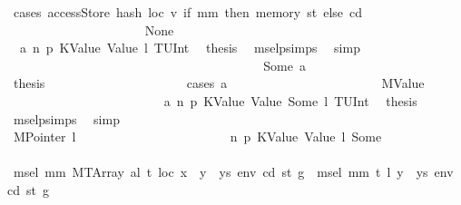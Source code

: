 \begin{isabellebody}
\ {\isacharparenleft}{\kern0pt}cases\ {\isachardoublequoteopen}accessStore\ {\isacharparenleft}{\kern0pt}hash\ loc\ v{\isacharparenright}{\kern0pt}\ {\isacharparenleft}{\kern0pt}if\ mm\ then\ memory\ st\ else\ cd{\isacharparenright}{\kern0pt}{\isachardoublequoteclose}{\isacharparenright}{\kern0pt}\isanewline
\ \ \ \ \ \ \ \ \ \ \ \ \ \ \ \ \ \ \ \ \isamarkupfalse%
\ None\isanewline
\ \ \ \ \ \ \ \ \ \ \ \ \ \ \ \ \ \ \ \ \isamarkupfalse%
\ {}\ a{}\ n\ p{}\ KValue\ Value\ l\ TUInt\ \isamarkupfalse%
\ {\isacharquery}{\kern0pt}thesis\ \isamarkupfalse%
\ msel{\isachardot}{\kern0pt}psimps{\isacharparenleft}{\kern0pt}{}{\isacharparenright}{\kern0pt}\ \isamarkupfalse%
\ simp\isanewline
\ \ \ \ \ \ \ \ \ \ \ \ \ \ \ \ \ \ \isamarkupfalse%
\isanewline
\ \ \ \ \ \ \ \ \ \ \ \ \ \ \ \ \ \ \ \ \isamarkupfalse%
\ {\isacharparenleft}{\kern0pt}Some\ a{\isacharparenright}{\kern0pt}\isanewline
\ \ \ \ \ \ \ \ \ \ \ \ \ \ \ \ \ \ \ \ \isamarkupfalse%
\ \isamarkupfalse%
\ {\isacharquery}{\kern0pt}thesis\isanewline
\ \ \ \ \ \ \ \ \ \ \ \ \ \ \ \ \ \ \ \ \isamarkupfalse%
\ {\isacharparenleft}{\kern0pt}cases\ a{\isacharparenright}{\kern0pt}\isanewline
\ \ \ \ \ \ \ \ \ \ \ \ \ \ \ \ \ \ \ \ \ \ \isamarkupfalse%
\ {\isacharparenleft}{\kern0pt}MValue\ {\isacharunderscore}{\kern0pt}{\isacharparenright}{\kern0pt}\isanewline
\ \ \ \ \ \ \ \ \ \ \ \ \ \ \ \ \ \ \ \ \ \ \isamarkupfalse%
\ {}\ a{}\ n\ p{}\ KValue\ Value\ Some\ l\ TUInt\ \isamarkupfalse%
\ {\isacharquery}{\kern0pt}thesis\ \isamarkupfalse%
\ msel{\isachardot}{\kern0pt}psimps{\isacharparenleft}{\kern0pt}{}{\isacharparenright}{\kern0pt}\ \isamarkupfalse%
\ simp\isanewline
\ \ \ \ \ \ \ \ \ \ \ \ \ \ \ \ \ \ \ \ \isamarkupfalse%
\isanewline
\ \ \ \ \ \ \ \ \ \ \ \ \ \ \ \ \ \ \ \ \ \ \isamarkupfalse%
\ {\isacharparenleft}{\kern0pt}MPointer\ l{\isacharparenright}{\kern0pt}\isanewline
\ \ \ \ \ \ \ \ \ \ \ \ \ \ \ \ \ \ \ \ \ \ \isamarkupfalse%
\ n\ p{}\ KValue\ Value\ l\ Some\isanewline
\ \ \ \ \ \ \ \ \ \ \ \ \ \ \ \ \ \ \ \ \ \ \isamarkupfalse%
\ {\isachardoublequoteopen}msel\ mm\ {\isacharparenleft}{\kern0pt}MTArray\ al\ t{\isacharparenright}{\kern0pt}\ loc\ {\isacharparenleft}{\kern0pt}x\ {\isacharhash}{\kern0pt}\ y\ {\isacharhash}{\kern0pt}\ ys{\isacharparenright}{\kern0pt}\ env\ cd\ st\ g\ {\isacharequal}{\kern0pt}\ msel\ mm\ t\ l\ {\isacharparenleft}{\kern0pt}y\ {\isacharhash}{\kern0pt}\ ys{\isacharparenright}{\kern0pt}\ env\ cd\ st\ g{\isacharprime}{\kern0pt}{\isachardoublequoteclose}\isanewline

\end{isabellebody}
